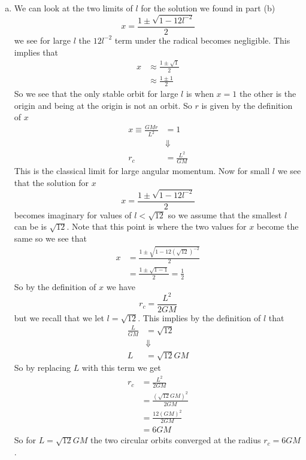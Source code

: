 \documentclass[11pt]{article}
\numberwithin{equation}{section}
\begin{document}
\begin{enumerate}[(a)]
\item
We can look at the two limits of $l$ for the solution we found in part (b) 
$$x = \frac{1 \pm \sqrt{1 - 12l^{-2}}}{2}$$
we see for large $l$ the $12l^{-2}$ term under the radical becomes negligible. This implies that
\begin{align*}
x &\approx  \frac{1 \pm \sqrt{1}}{2}\\
&\approx  \frac{1 \pm 1}{2}
\end{align*}
So we see that the only stable orbit for large $l$ is when $x=1$ the other is the origin and being at the origin is not an orbit. So $r$ is given by the definition of $x$ 
\begin{align*}
x \equiv \frac{GMr}{L^2} &= 1\\
&\Downarrow\\
r_c &= \frac{L^2}{GM}
\end{align*}
This is the classical limit for large angular momentum. Now for small $l$ we see that the solution for $x$
$$x = \frac{1 \pm \sqrt{1 - 12l^{-2}}}{2}$$
becomes imaginary for values of $l<\sqrt{12}$ so we assume that the smallest $l$ can be is $\sqrt{12}$. Note that this point is where the two values for $x$ become the same so we see that
\begin{align*}
x &= \frac{1 \pm \sqrt{1 - 12(\sqrt{12})^{-2}}}{2}\\
&= \frac{1 \pm \sqrt{1 - 1}}{2} = \frac{1}{2}
\end{align*}
So by the definition of $x$ we have
$$r_c = \frac{L^2}{2GM}$$
but we recall that we let $l = \sqrt{12}$. This implies by the definition of $l$ that
\begin{align*}
\frac{L}{GM} &= \sqrt{12}\\
&\Downarrow\\
L &= \sqrt{12}GM
\end{align*}
So by replacing $L$ with this term we get
\begin{align*}
r_c &= \frac{L^2}{2GM}\\
&= \frac{(\sqrt{12}GM)^2}{2GM}\\
&= \frac{12(GM)^2}{2GM}\\
&= 6GM
\end{align*}
So for $L = \sqrt{12}GM$ the two circular orbits converged at the radius $r_c = 6GM$.
\end{enumerate}
\end{document}
